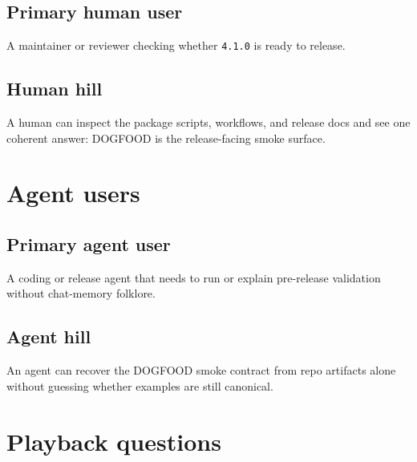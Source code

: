 \subsection{Primary human user}\label{record-201-primary-human-user}

A maintainer or reviewer checking whether \texttt{4\allowbreak{}.\allowbreak{}1\allowbreak{}.\allowbreak{}0} is ready to release.

\subsection{Human hill}\label{record-201-human-hill}

A human can inspect the package scripts, workflows, and release docs and see one coherent answer: DOGFOOD is the release-facing smoke surface.

\section{Agent users}\label{record-201-agent-users}

\subsection{Primary agent user}\label{record-201-primary-agent-user}

A coding or release agent that needs to run or explain pre-release validation without chat-memory folklore.

\subsection{Agent hill}\label{record-201-agent-hill}

An agent can recover the DOGFOOD smoke contract from repo artifacts alone without guessing whether examples are still canonical.

\section{Playback questions}\label{record-201-playback-questions}

